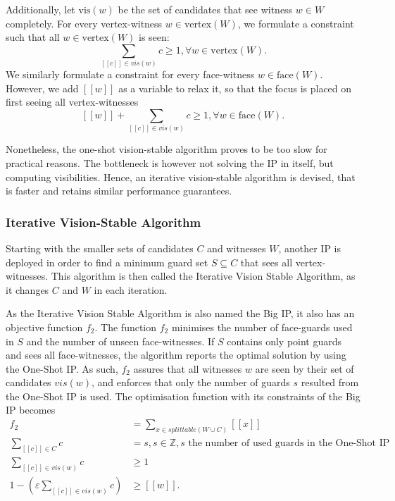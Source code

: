 Additionally, let $\text{vis}(w)$ be the set of candidates that see witness $w \in W$ completely. For every vertex-witness $w \in \text{vertex}(W)$, we formulate a constraint such that all $w \in \text{vertex}(W)$ is seen: $$\sum_{[[c]] \in vis(w)} c \geq 1, \forall w \in \text{vertex}(W).$$ We similarly formulate a constraint for every face-witness $w \in \text{face}(W)$. However, we add $[[w]]$ as a variable to relax it, so that the focus is placed on first seeing all vertex-witnesses $$[[w]] + \sum_{[[c]] \in vis(w)} c \geq 1, \forall w \in \text{face}(W).$$


Nonetheless, the one-shot vision-stable algorithm proves to be too slow for practical reasons. The bottleneck is however not solving the IP in itself, but computing visibilities. Hence, an iterative vision-stable algorithm is devised, that is faster and retains similar performance guarantees. 

\subsubsection{Iterative Vision-Stable Algorithm}
Starting with the smaller sets of candidates $C$ and witnesses $W$, another IP is deployed in order to find a minimum guard set $S \subseteq C$ that sees all vertex-witnesses. This algorithm is then called the Iterative Vision Stable Algorithm, as it changes $C$ and $W$ in each iteration.

As the Iterative Vision Stable Algorithm is also named the Big IP, it also has an objective function $f_2$. The function $f_2$ minimises the number of face-guards used in $S$ and the number of unseen face-witnesses. If $S$ contains only point guards and sees all face-witnesses, the algorithm reports the optimal solution by using the One-Shot IP. As such, $f_2$ assures that all witnesses $w$ are seen by their set of candidates $vis(w)$, and enforces that only the number of guards $s$ resulted from the One-Shot IP is used. The optimisation function with its constraints of the Big IP becomes
\begin{align}
	f_2 &= \sum_{x \in splittable(W \cup C)} [[x]] \label{eq:f2}\\
	\sum_{[[c]] \in C} c &= s, s \in \mathbb Z, s \text{ the number of used guards in the One-Shot IP} \\
	\sum_{[[c]] \in vis(w)} c &\geq 1 \\
	1 - (\varepsilon \sum_{[[c]] \in vis(w)} c) &\geq [[w]].
\end{align}

